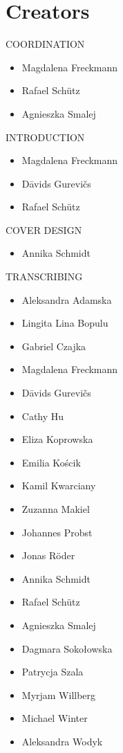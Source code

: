 \section{Creators}
\vspace*{2em}
COORDINATION
\begin{itemize}
	\item[]Magdalena Freckmann
	\item[]Rafael Schütz
	\item[]Agnieszka Smalej
\end{itemize}

INTRODUCTION
\begin{itemize}
	\item[]Magdalena Freckmann
	\item[]Dāvids Gurevičs
	\item[]Rafael  Schütz
\end{itemize}

COVER DESIGN
\begin{itemize}
	\item[]Annika Schmidt
\end{itemize}

TRANSCRIBING
\begin{itemize}
	\item[]Aleksandra Adamska
	\item[]Lingita Lina Bopulu
	\item[]Gabriel Czajka
	\item[]Magdalena Freckmann
	\item[]Dāvids Gurevičs
	\item[]Cathy Hu
	\item[]Eliza Koprowska
	\item[]Emilia Kościk
	\item[]Kamil Kwarciany
	\item[]Zuzanna Makiel
	\item[]Johannes Probst
	\item[]Jonas Röder
	\item[]Annika Schmidt
	\item[]Rafael Schütz
	\item[]Agnieszka Smalej
	\item[]Dagmara Sokołowska
	\item[]Patrycja Szala
	\item[]Myrjam Willberg
	\item[]Michael Winter
	\item[]Aleksandra Wodyk
\end{itemize}

